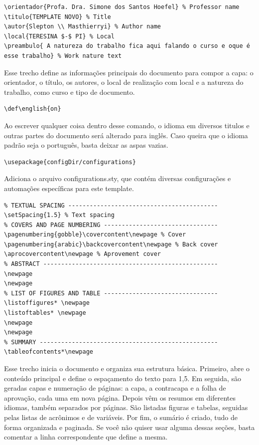 \begin{lstlisting}[firstnumber=last]
\orientador{Profa. Dra. Simone dos Santos Hoefel} % Professor name
\titulo{TEMPLATE NOVO} % Title
\autor{Slepton \\ Masthierryi} % Author name
\local{TERESINA $-$ PI} % Local
\preambulo{ A natureza do trabalho fica aqui falando o curso e oque é esse trabalho} % Work nature text
\end{lstlisting}

Esse trecho define as informações principais do documento para compor a capa: o orientador, o título, os autores, o local de realização com local e a natureza do trabalho, como curso e tipo de documento.

\begin{lstlisting}[firstnumber=last]
\def\english{on}
\end{lstlisting}

Ao escrever qualquer coisa dentro desse comando, o idioma em diversos titulos e outras partes do documento será alterado para inglês. Caso queira que o idioma padrão seja o português, basta deixar as aspas vazias.

\begin{lstlisting}[firstnumber=last]
\usepackage{configDir/configurations}
\end{lstlisting}

Adiciona o arquivo configurations.sty, que contém diversas configurações e automações específicas para este template.

\begin{lstlisting}[firstnumber=last]
 % DOCUMENT 
% TEXTUAL SPACING ------------------------------------------
\setSpacing{1.5} % Text spacing
% COVERS AND PAGE NUMBERING --------------------------------
\pagenumbering{gobble}\covercontent\newpage % Cover
\pagenumbering{arabic}\backcovercontent\newpage % Back cover
\aprocovercontent\newpage % Aprovement cover
% ABSTRACT -------------------------------------------------
\newpage
\newpage
% LIST OF FIGURES AND TABLE --------------------------------
\listoffigures* \newpage 
\listoftables* \newpage
\newpage
\newpage
% SUMMARY --------------------------------------------------
\tableofcontents*\newpage
\end{lstlisting}

Esse trecho inicia o documento e organiza sua estrutura básica. Primeiro, abre o conteúdo principal e define o espaçamento do texto para 1,5. Em seguida, são geradas capas e numeração de páginas: a capa, a contracapa e a folha de aprovação, cada uma em nova página. Depois vêm os resumos em diferentes idiomas, também separados por páginas. São listadas figuras e tabelas, seguidas pelas listas de acrônimos e de variáveis. Por fim, o sumário é criado, tudo de forma organizada e paginada. Se você não quiser usar alguma dessas seções, basta comentar a linha correspondente que define a mesma.

